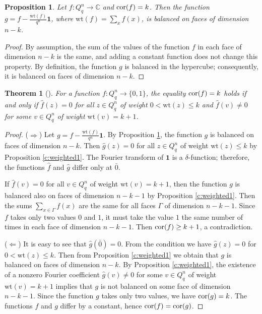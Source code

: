 \documentclass[11pt]{article}
\newtheorem{theorem}{Theorem}[section]
\newtheorem{claim}{Proposition}[section]
\theoremstyle{definition}
\newcommand{\cor}{{\rm cor}}
\begin{document}
{{{\begin{claim}\label{c:weighted2}
    Let $f: Q_q^n\rightarrow \mathbb{C}$ and $\cor(f)=k$.
    Then the function $g=f-\frac{\mathrm{wt}(f)}{q^n}\mathbf{1}$, where $\mathrm{wt}(f)=\sum_x
    f(x)$,
    is balanced on faces of dimension $n-k$.
\end{claim}
\begin{proof}
    By assumption, the sum of the values of the function $f$ in each face of dimension
    $n-k$ is the same, and adding a constant function does not change this
    property. By definition, the function $g$ is balanced in the hypercube;
    consequently, it is balanced on faces of dimension $n-k$.
\end{proof}

\begin{theorem}[\cite{Carlet20}]\label{t:cor-im}
    For a function $f:Q_q^n\rightarrow \{0,1\}$, the equality $\cor(f)=k$ holds
    if and only if
    $\widehat{f}(z)=0$ for all $ z\in Q_q^n$ of weight $0<\mathrm{wt}(z)\le k$ and
    $\widehat{f}(v)\neq 0$ for some $v\in Q_q^n$ of weight $\mathrm{wt}(v)=k+1$.
\end{theorem}
\begin{proof}
    ($\Rightarrow$) Let $g=f-\frac{\mathrm{wt}(f)}{q^n}\mathbf{1}$.
 By Proposition \ref{c:weighted2}, the function $g$ is balanced
 on faces of dimension $n-k$. Then $\widehat{g}(z)=0$
  for all $ z\in Q_q^n$ of weight $\mathrm{wt}(z)\le k$ by Proposition \ref{c:weighted1}. The Fourier transform of $\mathbf{1}$ is a
  $\delta$-function; therefore, the functions $\widehat{f}$
  and $\widehat{g}$ differ only at $\bar{0}$.

  If $\widehat{f}(v)= 0$ for all $v\in Q_q^n$ of weight
  $\mathrm{wt}(v)=k+1$, then the function $g$ is balanced also on faces
  of dimension $n-k-1$ by Proposition \ref{c:weighted1}. Then the sums
  $\sum_{x\in \Gamma}f(x)$ are the same for all faces $\Gamma$
  of dimension $n-k-1$. Since $f$ takes only two values $0$ and $1$,
  it must take the value $1$ the same number of times in each face of dimension
  $n-k-1$. Then $\cor(f)\ge k+1$, a contradiction.

    ($\Leftarrow$) It is easy to see that $\widehat{g}(\bar{0})=0$. From the condition we have
    $\widehat{g}(z)=0$ for $0<\mathrm{wt}(z)\le k$. Then from Proposition
    \ref{c:weighted1}
    we obtain that $g$ is balanced on faces of dimension $n-k$.
    By Proposition \ref{c:weighted1}, the existence of a nonzero Fourier coefficient
    $\widehat{g}(v)\neq 0$ for some $v\in Q_q^n$ of weight $\mathrm{wt}(v)=k+1$ implies
    that $g$ is not balanced on some face
    of dimension $n-k-1$.
    Since the function $g$ takes only two
    values, we have
    $\cor(g)=k$. The functions $f$ and $g$ differ by a constant,
    hence $\cor(f)=\cor(g)$.
\end{proof}

}}}
\end{document}
